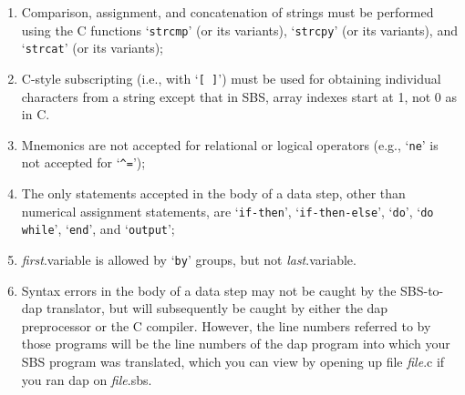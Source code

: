\documentclass{book}
\newcommand\Texinfocommandstyletextvar[1]{{\normalfont{}\textsl{#1}}}%
\renewcommand{\_}{\Texinfounderscore\discretionary{}{}{}}
\begin{document}
\begin{enumerate}[start=1]
\item Comparison, assignment, and concatenation of strings must be performed
using the C functions `\texttt{strcmp}' (or its variants),
`\texttt{strcpy}' (or its variants), and `\texttt{strcat}' (or its variants);

\item C-style subscripting (i.e., with `\texttt{[ ]}') must be used for obtaining
individual characters from a string except that in SBS, array indexes start at
1, not 0 as in C.

\item Mnemonics are not accepted for relational or logical operators (e.g., `\texttt{ne}'
is not accepted for `\texttt{\^{}=}');

\item The only statements accepted in the body of a data step, other than numerical
assignment statements, are `\texttt{if-then}', `\texttt{if-then-else}',
`\texttt{do}', `\texttt{do while}', `\texttt{end}', and `\texttt{output}';

\item \Texinfocommandstyletextvar{first}.variable is allowed by `\texttt{by}' groups, but not \Texinfocommandstyletextvar{last}.variable.

\item Syntax errors in the body of a data step may not be caught by the SBS-to-dap
translator, but will subsequently be caught by either the dap preprocessor
or the C compiler. However, the line numbers referred to by those programs will
be the line numbers of the dap program into which your SBS program was translated,
which you can view by opening up file \Texinfocommandstyletextvar{file}.c if you ran dap on \Texinfocommandstyletextvar{file}.sbs.

\end{enumerate}

%
\end{document}
